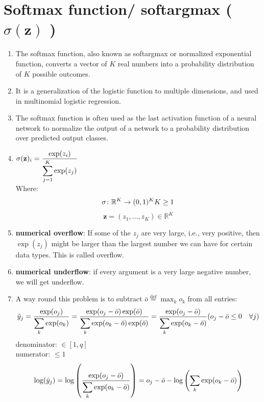 \section{Softmax function/ softargmax ( $\sigma (\mathbf {z})$ ) \cite{wiki-softmax-function,dnn-1}} \label{Softmax function}
\begin{enumerate}
    \item The softmax function, also known as softargmax or normalized exponential function, converts a vector of $K$ real numbers into a probability distribution of $K$ possible outcomes. 
    
    \item It is a generalization of the logistic function to multiple dimensions, and used in multinomial logistic regression. 
    
    \item The softmax function is often used as the last activation function of a neural network to normalize the output of a network to a probability distribution over predicted output classes.

    \item $
        {\displaystyle \sigma (\mathbf {z} )_{i}={\displaystyle\dfrac {\exp({z_{i}})}{\displaystyle\sum _{j=1}^{K} \exp({z_{j}})}}}
    $\\
    Where:
    \[
        {\displaystyle \sigma \colon \mathbb {R} ^{K}\to (0,1)^{K}}
        \hfill
        {\displaystyle K\geq 1}
    \]
    \[
        {\displaystyle \mathbf {z} =(z_{1},\dotsc ,z_{K})\in \mathbb {R} ^{K}}
    \]

    \item \textbf{numerical overflow}: If some of the $z_j$ are very large, i.e., very positive, then $\exp(z_j)$ might be larger than the largest number we can have for certain data types. This is called overflow.
    
    \item \textbf{numerical underflow}: if every argument is a very large negative number, we will get underflow.
    
    \item A way round this problem is to subtract $\bar{o} \stackrel{\textrm{def}}{=} \max_k o_k$ from all entries:
    \[
        \hfill
        \hat y_j 
        = \dfrac{\exp (o_j)}{\dsum_k \exp (o_k)} 
        = \dfrac{\exp(o_j - \bar{o}) \exp (\bar{o})}{\dsum_k \exp (o_k - \bar{o}) \exp (\bar{o})} 
        = \dfrac{\exp(o_j - \bar{o})}{\dsum_k \exp (o_k - \bar{o})}
        \hfill
        (o_j - \bar{o} \leq 0 \quad \forall j)
    \]
    denominator: $\in [1, q]$\\
    numerator: $\leq 1$ \\
    \[
        \hfill
        \log (\hat{y}_j )
        = \log \dParenBrac{\dfrac{\exp(o_j - \bar{o})}{\dsum_k \exp (o_k - \bar{o})} }
        = o_j - \bar{o} - \log \dParenBrac{\dsum_k \exp (o_k - \bar{o})}
        \hfill
    \]
    
\end{enumerate}


